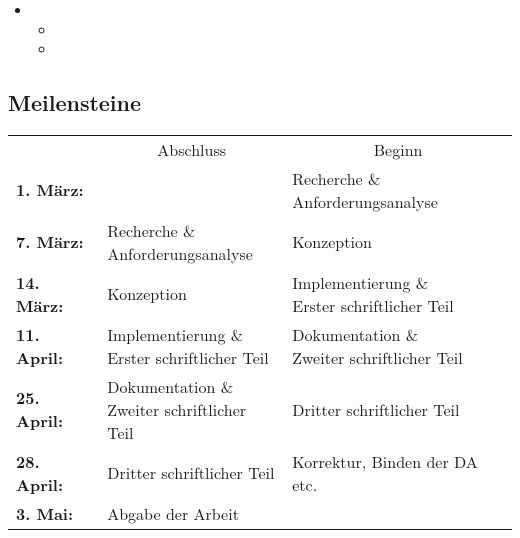 \begin{itemize}
\begin{itemize}
          \begin{itemize}
            \item {}
            \item {}
          \end{itemize}
        \item {}
          \begin{itemize}
            \item {}
            \item {}
          \end{itemize}
      \end{itemize}
  \end{itemize}

  \subsection{Meilensteine}
  \label{ssec:meilensteine}
    \begin{table}[H]
      \begin{tabularx}{\textwidth}{lXX}
        {}
          & \multicolumn{1}{c}{Abschluss}
            & \multicolumn{1}{c}{Beginn}\\
        \cline{2-3}
        \textbf{1. März:}
          & {}
            & \specialcell[t]{Recherche \&\\Anforderungsanalyse}\\
        \textbf{7. März:}
          & \specialcell[t]{Recherche \&\\Anforderungsanalyse}
            & Konzeption\\
        \textbf{14. März:}
          & Konzeption
            & \specialcell[t]{Implementierung \&\\Erster schriftlicher Teil}\\
        \textbf{11. April:}
          & \specialcell[t]{Implementierung \&\\Erster schriftlicher Teil}
            & \specialcell[t]{Dokumentation \&\\Zweiter schriftlicher Teil}\\
        \textbf{25. April:}
          & \specialcell[t]{Dokumentation \&\\Zweiter schriftlicher Teil}
            & Dritter schriftlicher Teil\\
        \textbf{28. April:}
          & Dritter schriftlicher Teil
            & Korrektur, Binden der DA etc.\\
        \textbf{3. Mai:}
          & Abgabe der Arbeit
            &\\
      \end{tabularx}
    \end{table}
\pagebreak
